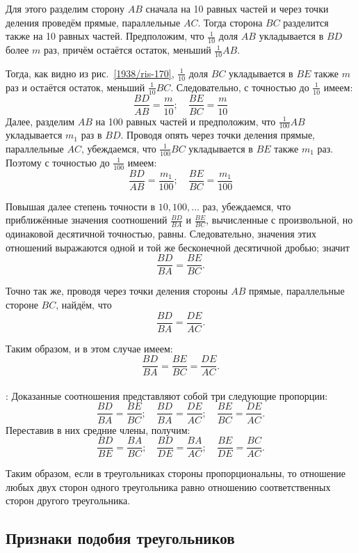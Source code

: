 Для этого разделим сторону $AB$ сначала на 10 равных частей и через точки деления проведём прямые, параллельные $AC$.
Тогда сторона $BC$ разделится также на 10 равных частей.
Предположим, что $\tfrac1{10}$ доля $AB$ укладывается в $BD$ более $m$
раз, причём остаётся остаток, меньший $\tfrac1{10}AB$.

Тогда, как видно из рис.~\ref{1938/ris-170}, $\tfrac1{10}$ доля $BC$ укладывается в $BE$ также $m$ раз и остаётся остаток, меньший $\tfrac1{10}BC$.
Следовательно, с точностью до $\tfrac1{10}$ имеем:
\[\frac{BD}{AB}=\frac{m}{10}; 
\quad
\frac{BE}{BC}=\frac{m}{10}\]
Далее, разделим $AB$ на 100 равных частей и предположим, что $\tfrac1{100}AB$ укладывается $m_1$ раз в $BD$.
Проводя опять через точки деления прямые, параллельные $AC$, убеждаемся, что $\tfrac1{100}BC$ укладывается в $BE$ также $m_1$ раз.
Поэтому с точностью до $\tfrac1{100}$ имеем:
\[\frac{BD}{AB}=\frac{m_1}{100}; 
\quad
\frac{BE}{BC}=\frac{m_1}{100}\]

Повышая далее степень точности в $10,100,\dots$ раз, убеждаемся, что приближённые значения соотношений $\frac{BD}{BA}$ и $\frac{BE}{BC}$, вычисленные с произвольной, но одинаковой десятичной точностью, равны.
Следовательно, значения этих отношений выражаются одной и той же бесконечной десятичной дробью;
значит
\[\frac{BD}{BA}=\frac{BE}{BC}.\]

Точно так же, проводя через точки деления стороны $AB$ прямые, параллельные стороне $BC$, найдём, что
\[\frac{BD}{BA}=\frac{DE}{AC}.\]

Таким образом, и в этом случае имеем:
\[\frac{BD}{BA}=\frac{BE}{BC}=\frac{DE}{AC}.\]


\paragraph{}\label{1938/160}
:
Доказанные соотношения представляют собой три следующие пропорции:
\[\frac{BD}{BA}=\frac{BE}{BC};
\quad
\frac{BD}{BA}=\frac{DE}{AC};
\quad
\frac{BE}{BC}=\frac{DE}{AC}.\]
Переставив в них средние члены, получим:
\[\frac{BD}{BE}=\frac{BA}{BC};
\quad
\frac{BD}{DE}=\frac{BA}{AC};
\quad
\frac{BE}{DE}=\frac{BC}{AC}.\]

Таким образом, если в треугольниках стороны пропорциональны, то отношение любых двух сторон одного треугольника равно отношению соответственных сторон другого треугольника.

\subsection*{Признаки подобия треугольников}

